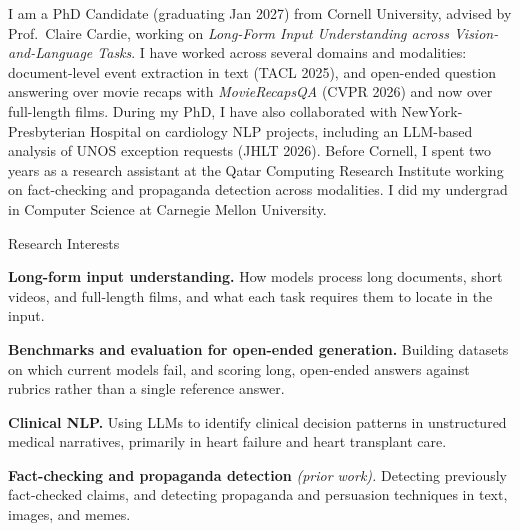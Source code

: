 
\begin{cvparagraph}
I am a PhD Candidate (graduating Jan 2027) from Cornell University, advised by Prof.\ Claire Cardie, working on \textit{Long-Form Input Understanding across Vision-and-Language Tasks}. I have worked across several domains and modalities: document-level event extraction in text (TACL 2025), and open-ended question answering over movie recaps with \textit{MovieRecapsQA} (CVPR 2026) and now over full-length films. During my PhD, I have also collaborated with NewYork-Presbyterian Hospital on cardiology NLP projects, including an LLM-based analysis of UNOS exception requests (JHLT 2026).
Before Cornell, I spent two years as a research assistant at the Qatar Computing Research Institute working on fact-checking and propaganda detection across modalities. I did my undergrad in Computer Science at Carnegie Mellon University.
\end{cvparagraph}

\vspace{-3mm}
\begin{cventries}
  \cvtitleentry
    {Research Interests}
    {
      \begin{cvitems}
        \item \textbf{Long-form input understanding.} How models process long documents, short videos, and full-length films, and what each task requires them to locate in the input.
        \item \textbf{Benchmarks and evaluation for open-ended generation.} Building datasets on which current models fail, and scoring long, open-ended answers against rubrics rather than a single reference answer.
        \item \textbf{Clinical NLP.} Using LLMs to identify clinical decision patterns in unstructured medical narratives, primarily in heart failure and heart transplant care.
        \item \textbf{Fact-checking and propaganda detection} \textit{(prior work).} Detecting previously fact-checked claims, and detecting propaganda and persuasion techniques in text, images, and memes.
      \end{cvitems}
    }
\end{cventries}


